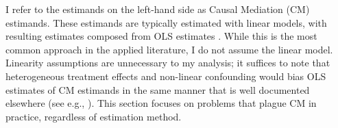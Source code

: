 I refer to the estimands on the left-hand side as Causal Mediation (CM) estimands.
These estimands are typically estimated with linear models, with resulting estimates composed from OLS estimates \citep{imai2010identification}.
While this is the most common approach in the applied literature, I do not assume the linear model.
Linearity assumptions are unnecessary to my analysis; it suffices to note that heterogeneous treatment effects and non-linear confounding would bias OLS estimates of CM estimands in the same manner that is well documented elsewhere (see e.g., \citealt{angrist1998estimating,sloczynski2022interpreting}).
This section focuses on problems that plague CM in practice, regardless of estimation method.

